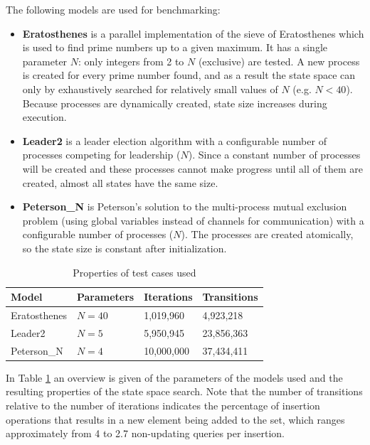 \documentclass{acm_proc_article-sp}
\begin{document}

The following models are used for benchmarking:
\begin{itemize}
\item\textbf{Eratosthenes} is a parallel implementation of the sieve
of Eratosthenes which is used to find prime numbers up to a given maximum.
It has a single parameter $N$: only integers from 2 to $N$ (exclusive) are
tested. A new process is created for every prime number found, and as a result
the state space can only by exhaustively searched for relatively small values
of $N$ (e.g. $N < 40$). Because processes are dynamically created, state size
increases during execution.

\item\textbf{Leader2} is a leader election algorithm with a configurable number
of processes competing for leadership ($N$). Since a constant number of
processes will be created and these processes cannot make progress until all
of them are created, almost all states have the same size.

\item\textbf{Peterson\_N} is Peterson's solution to the multi-process mutual
exclusion problem (using global variables instead of channels for
communication) with a configurable number of processes ($N$). The processes
are created atomically, so the state size is constant after initialization.
\end{itemize}

\begin{table}
\begin{center}
\begin{tabular}{ l l l l }
\hline
\textbf{Model} & \textbf{Parameters} & \textbf{Iterations} & \textbf{Transitions} \\
\hline
Eratosthenes & $N=40$ &  1,019,960 &  4,923,218 \\
Leader2      & $N=5$  &  5,950,945 & 23,856,363 \\
Peterson\_N  & $N=4$  & 10,000,000 & 37,434,411 \\
\hline
\end{tabular}
\caption{Properties of test cases used}
\label{tab-cases}
\end{center}
\end{table}

In Table \ref{tab-cases} an overview is given of the parameters of the models used
and the resulting properties of the state space search.
Note that the number of transitions relative to the number of iterations indicates
the percentage of insertion operations that results in a new element being added
to the set, which ranges approximately from 4 to 2.7 non-updating queries per
insertion.
\end{document}

